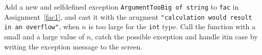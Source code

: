\label{fac} Add a new and selfdefined exception \lstinline{ArgumentTooBig of string} to \lstinline{fac} in Assignment~\ref{fac1}, and cast it with the arugment \lstinline{"calculation would result in an overflow"}, when $n$ is too large for the \lstinline{int} type. Call the function with a small and a large value of $n$, catch the possible exception and handle itin case by writing the exception message to the screen.